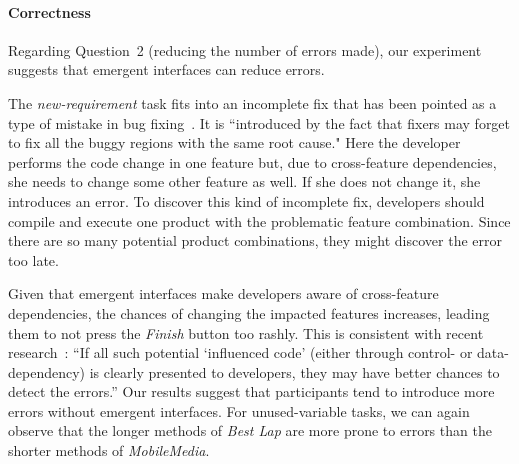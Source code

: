 
\paragraph{Correctness}
Regarding Question~2 (reducing the number of errors made), our experiment suggests that emergent interfaces can reduce errors.

The \textit{new-requirement} task fits into an incomplete fix that has been pointed as a type of mistake in bug fixing~\cite{yin-fixes-become-bugs-fse11}. It is ``introduced by the fact that fixers may forget to fix all the buggy regions with the same root cause." Here the developer performs the code change in one feature but, due to cross-feature dependencies, she needs to change some other feature as well. If she does not change it, she introduces an error. To discover this kind of incomplete fix, developers should compile and execute one product with the problematic feature combination. Since there are so many potential product combinations, they might discover the error too late.

Given that emergent interfaces make developers aware of cross-feature dependencies, the chances of changing the impacted features increases, leading them to not press the \textit{Finish} button too rashly. This is consistent with recent research~\cite{yin-fixes-become-bugs-fse11}: ``If all such potential `influenced code' (either through control- or data-dependency) is clearly presented to developers, they may have better chances to detect the errors.'' Our results suggest that participants tend to introduce more errors without emergent interfaces. For unused-variable tasks, we can again observe that the longer methods of \textit{Best Lap} are more prone to errors than the shorter methods of \textit{MobileMedia}.

